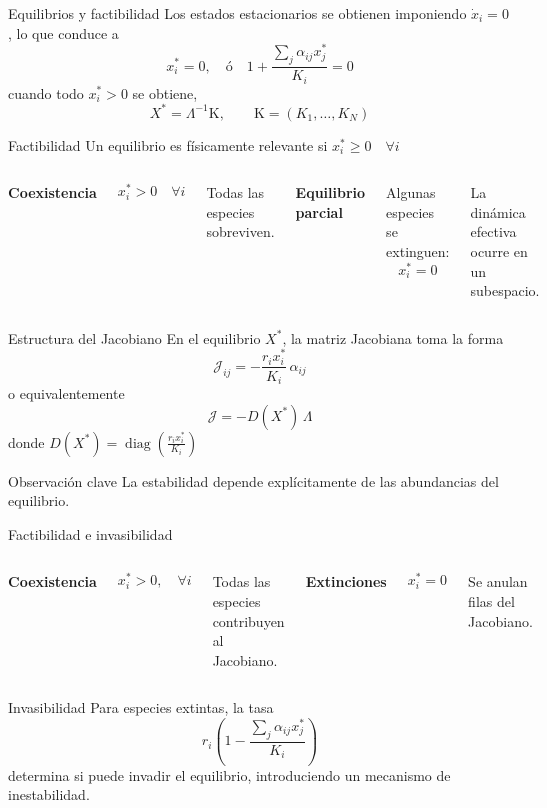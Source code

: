 \documentclass[10pt,aspectratio=169]{beamer}
\theoremstyle{plain}
\theoremstyle{definition}
\newcommand{\X}{X^*}
\begin{document}
\begin{frame}{Equilibrios y factibilidad}
	Los estados estacionarios se obtienen imponiendo $\dot{x}_i=0$, lo que conduce a
	$$x_i^*=0,\quad\text{ó}\quad1+\frac{\sum_j\alpha_{ij}x_j^*}{K_i}=0$$
	cuando todo $x_i^*>0$ se obtiene,
	$$X^* = \Lambda^{-1}\mathrm{K},\qquad\mathrm{K}=(K_1,\dots,K_N)$$
	
	\vspace{0.3cm}
	\begin{block}{Factibilidad}
		Un equilibrio es físicamente relevante si $x_i^* \geq 0 \quad \forall i$
	\end{block}
	\vspace{0.3cm}
	\begin{columns}
		\textbf{Coexistencia}
		
		\[
		x_i^* > 0 \quad \forall i
		\]
		
		Todas las especies sobreviven.
		
		\textbf{Equilibrio parcial}
		
		Algunas especies se extinguen:
		\[
		x_i^* = 0
		\]
		
		La dinámica efectiva ocurre en un subespacio.
	\end{columns}
\end{frame}

\begin{frame}{Estructura del Jacobiano}
	En el equilibrio $\X$, la matriz Jacobiana toma la forma
	$$\mathcal{J}_{ij}=-\frac{r_ix_i^*}{K_i}\, \alpha_{ij}$$
	\vspace{0.3cm}
	o equivalentemente
	$$\mathcal{J}=-D(\X)\, \Lambda$$
	donde $D(\X)=\operatorname{diag}\left (\frac{r_ix_i^*}{K_i}\right )$
	\vspace{0.4cm}
	\begin{block}{Observación clave}
		La estabilidad depende explícitamente de las abundancias del equilibrio.
	\end{block}
\end{frame}

\begin{frame}{Factibilidad e invasibilidad}
	\begin{columns}
		\column{0.5\textwidth}
		\textbf{Coexistencia}
		
		$$x_i^*>0,\quad\forall i$$
		
		Todas las especies contribuyen al Jacobiano.
		
		\column{0.5\textwidth}
		\textbf{Extinciones}
		
		$$x_i^*=0$$
		
		Se anulan filas del Jacobiano.
	\end{columns}
	\vspace{0.4cm}
	\begin{alertblock}{Invasibilidad}
		Para especies extintas, la tasa 
		$$r_i\left (1-\frac{\sum_j\alpha_{ij}x_j^*}{K_i}\right )$$
		determina si puede invadir el equilibrio, introduciendo un mecanismo de inestabilidad.
	\end{alertblock}
\end{frame}
\end{document}
